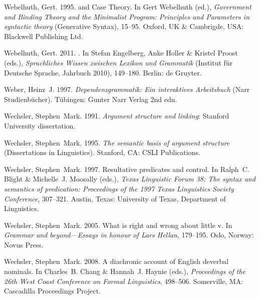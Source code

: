 \begin{thebibliography}{1420}
Webelhuth, Gert. 1995.
 and {Case Theory}.
\newblock In Gert Webelhuth (ed.), \emph{{Government and Binding Theory} and
  the {Minimalist Program}: {Principles and Parameters} in syntactic theory}
  (Generative Syntax), 15--95. Oxford, UK \& Cambrigde, USA: Blackwell
  Publishing Ltd.

Webelhuth, Gert. 2011.
.
\newblock In Stefan Engelberg, Anke Holler \& Kristel Proost (eds.),
  \emph{{Sprachliches Wissen zwischen Lexikon und Grammatik}}  (Institut
  f{\"u}r Deutsche Sprache, Jahrbuch 2010), 149--180. Berlin: de Gruyter.

Weber, Heinz~J. 1997.
\newblock \emph{{Dependenzgrammatik: Ein interaktives Arbeitsbuch}}  (Narr
  Studienb{\"u}cher).
\newblock T{\"u}bingen: Gunter Narr Verlag 2nd edn.

Wechsler, Stephen~Mark. 1991.
\newblock \emph{Argument structure and linking}: Stanford University
  dissertation.

Wechsler, Stephen~Mark. 1995.
\newblock \emph{The semantic basis of argument structure}  (Dissertations in
  Linguistics).
\newblock Stanford, CA: CSLI Publications.

Wechsler, Stephen~Mark. 1997.
\newblock Resultative predicates and control.
\newblock In Ralph~C. Blight \& Michelle~J. Moosally (eds.), \emph{{Texas
  Linguistic Forum} 38: {The} syntax and semantics of predication: {Proceedings
  of the 1997 Texas Linguistics Society Conference}}, 307--321. Austin, Texas:
  University of Texas, Department of Linguistics.

Wechsler, Stephen~Mark. 2005.
\newblock What is right and wrong about little v.
\newblock In \emph{Grammar and beyond---{Essays} in honour of {Lars Hellan}},
  179--195. Oslo, Norway: Novus Press.

Wechsler, Stephen~Mark. 2008{}.
\newblock A diachronic account of {English} deverbal nominals.
\newblock In Charles~B. Chang \& Hannah~J. Haynie (eds.), \emph{Proceedings of
  the {26th West Coast Conference on Formal Linguistics}}, 498--506.
  Somerville, MA: Cascadilla Proceedings Project.


\end{thebibliography}
